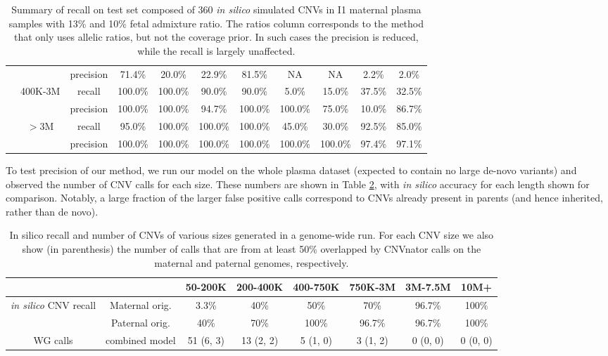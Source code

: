 \begin{table}[t]
\begin{tabular}{c|c|c||c|c||c|c||c|c||c|c}
    &        &    precision    &    71.4\%    &    20.0\%    &    22.9\%    &    81.5\%    &    NA    &    NA    &    2.2\%    &    2.0\%    \\    
    &    400K-3M    &    recall    &    100.0\%    &    100.0\%    &    90.0\%    &    90.0\%    &    5.0\%    &    15.0\%    &    37.5\%    &    32.5\%    \\    
    &        &    precision    &    100.0\%    &    100.0\%    &    94.7\%    &    100.0\%    &    100.0\%    &    75.0\%    &    10.0\%    &    86.7\%    \\    
    &    $>$3M    &    recall    &    95.0\%    &    100.0\%    &    100.0\%    &    100.0\%    &    45.0\%    &    30.0\%    &    92.5\%    &    85.0\%    \\    
    &        &    precision    &    100.0\%    &    100.0\%    &    100.0\%    &    100.0\%    &    100.0\%    &    100.0\%    &    97.4\%    &    97.1\%    \\   	
\end{tabular}
\vspace{3pt}
\caption{Summary of recall on test set composed of 360 \emph{in silico} simulated CNVs in I1 maternal plasma samples with 13\% and 10\% fetal admixture ratio. The ratios column corresponds to the method that only uses allelic ratios, but not the coverage prior. In such cases the precision is reduced, while the recall is largely unaffected.  }
\label{tab:resRecall} 
\end{table}

To test precision of our method, we run our model on the whole plasma dataset (expected to contain no large de-novo variants) and observed the number of CNV calls for each size. These numbers are shown in Table \ref{tab:resWGS}, with \textit{in silico} accuracy for each length shown for comparison. Notably, a large fraction of the larger false positive calls correspond to CNVs already present in parents (and hence inherited, rather than de novo). 


\begin{table}[t]
\centering
\begin{tabular}{c|c|c|c|c|c|c|c}
	&		&	50-200K	&	200-400K	&	400-750K	&	750K-3M	&	3M-7.5M	&	10M+ \\ \hline
\multirow{2}{*}{\emph{in silico} CNV recall}	&	Maternal orig.	&	3.3\%	&	40\%	&	50\%	&	70\%	&	96.7\%	&	100\%	\\
	&	Paternal orig.	&	40\%	&	70\%	&	100\%	&	96.7\%	&	96.7\%	&	100\%	\\ \hline
WG calls	&	combined model	&	51 (6, 3)	&	13 (2, 2)	&	5 (1, 0)	&	3 (1, 2)	&	0 (0, 0)	&	0 (0, 0)	\\
\end{tabular}
\vspace{3pt}
\caption{In silico recall and number of CNVs of various sizes generated in a genome-wide run. For each CNV size we also show (in parenthesis) the number of calls that are from at least 50\% overlapped by CNVnator \cite{abyzov2011cnvnator} calls on the maternal and paternal genomes, respectively.}
\label{tab:resWGS} 
\end{table}
\vspace{1cm}



